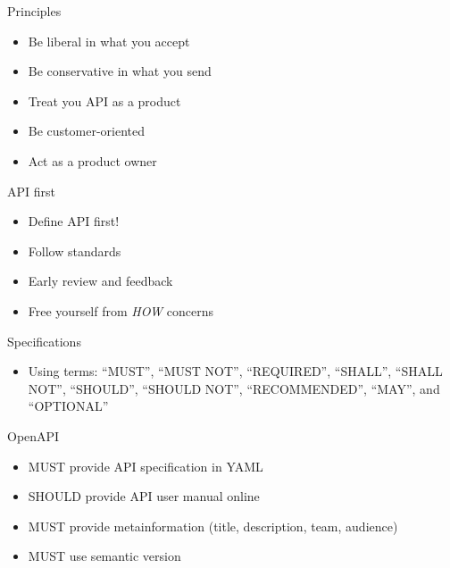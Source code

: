 \begin{frame}{Principles}

\begin{itemize}
\tightlist
\item
  Be liberal in what you accept
\item
  Be conservative in what you send
\item
  Treat you API as a product
\item
  Be customer-oriented
\item
  Act as a product owner
\end{itemize}

\end{frame}

\begin{frame}{API first}

\begin{itemize}
\tightlist
\item
  Define API first!
\item
  Follow standards
\item
  Early review and feedback
\item
  Free yourself from \emph{HOW} concerns
\end{itemize}

\end{frame}

\begin{frame}{Specifications}

\begin{itemize}
\tightlist
\item
  Using terms: ``MUST'', ``MUST NOT'', ``REQUIRED'', ``SHALL'', ``SHALL
  NOT'', ``SHOULD'', ``SHOULD NOT'', ``RECOMMENDED'', ``MAY'', and
  ``OPTIONAL''
\end{itemize}

\end{frame}

\begin{frame}{OpenAPI}

\begin{itemize}
\tightlist
\item
  MUST provide API specification in YAML
\item
  SHOULD provide API user manual online
\item
  MUST provide metainformation (title, description, team, audience)
\item
  MUST use semantic version
\end{itemize}

\end{frame}


